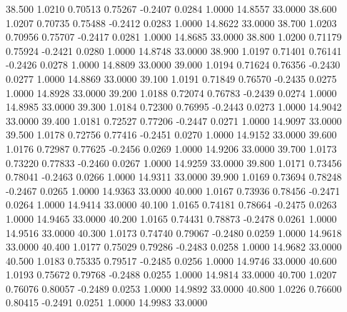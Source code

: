   38.500   1.0210   0.70513   0.75267  -0.2407   0.0284   1.0000  14.8557  33.0000
  38.600   1.0207   0.70735   0.75488  -0.2412   0.0283   1.0000  14.8622  33.0000
  38.700   1.0203   0.70956   0.75707  -0.2417   0.0281   1.0000  14.8685  33.0000
  38.800   1.0200   0.71179   0.75924  -0.2421   0.0280   1.0000  14.8748  33.0000
  38.900   1.0197   0.71401   0.76141  -0.2426   0.0278   1.0000  14.8809  33.0000
  39.000   1.0194   0.71624   0.76356  -0.2430   0.0277   1.0000  14.8869  33.0000
  39.100   1.0191   0.71849   0.76570  -0.2435   0.0275   1.0000  14.8928  33.0000
  39.200   1.0188   0.72074   0.76783  -0.2439   0.0274   1.0000  14.8985  33.0000
  39.300   1.0184   0.72300   0.76995  -0.2443   0.0273   1.0000  14.9042  33.0000
  39.400   1.0181   0.72527   0.77206  -0.2447   0.0271   1.0000  14.9097  33.0000
  39.500   1.0178   0.72756   0.77416  -0.2451   0.0270   1.0000  14.9152  33.0000
  39.600   1.0176   0.72987   0.77625  -0.2456   0.0269   1.0000  14.9206  33.0000
  39.700   1.0173   0.73220   0.77833  -0.2460   0.0267   1.0000  14.9259  33.0000
  39.800   1.0171   0.73456   0.78041  -0.2463   0.0266   1.0000  14.9311  33.0000
  39.900   1.0169   0.73694   0.78248  -0.2467   0.0265   1.0000  14.9363  33.0000
  40.000   1.0167   0.73936   0.78456  -0.2471   0.0264   1.0000  14.9414  33.0000
  40.100   1.0165   0.74181   0.78664  -0.2475   0.0263   1.0000  14.9465  33.0000
  40.200   1.0165   0.74431   0.78873  -0.2478   0.0261   1.0000  14.9516  33.0000
  40.300   1.0173   0.74740   0.79067  -0.2480   0.0259   1.0000  14.9618  33.0000
  40.400   1.0177   0.75029   0.79286  -0.2483   0.0258   1.0000  14.9682  33.0000
  40.500   1.0183   0.75335   0.79517  -0.2485   0.0256   1.0000  14.9746  33.0000
  40.600   1.0193   0.75672   0.79768  -0.2488   0.0255   1.0000  14.9814  33.0000
  40.700   1.0207   0.76076   0.80057  -0.2489   0.0253   1.0000  14.9892  33.0000
  40.800   1.0226   0.76600   0.80415  -0.2491   0.0251   1.0000  14.9983  33.0000
